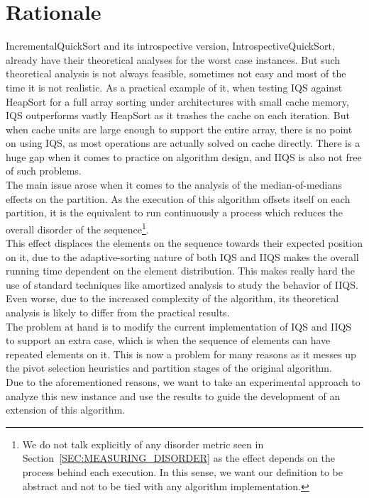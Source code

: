 
\section{Rationale}
IncrementalQuickSort and its introspective version, IntrospectiveQuickSort, already have their theoretical analyses for the worst case instances. But such theoretical analysis is not always feasible, sometimes not easy and most of the time it is not realistic. As a practical example of it, when testing IQS against HeapSort for a full array sorting under architectures with small cache memory, IQS outperforms vastly HeapSort as it trashes the cache on each iteration. But when cache units are large enough to support the entire array, there is no point on using IQS, as most operations are actually solved on cache directly. There is a huge gap when it comes to practice on algorithm design, and IIQS is also not free of such problems.\\

The main issue arose when it comes to the analysis of the median-of-medians effects on the partition. As the execution of this algorithm offsets itself on each partition, it is the equivalent to run continuously a process which reduces the overall disorder of the sequence\footnote{We do not talk explicitly of any disorder metric seen in Section~\ref{SEC:MEASURING_DISORDER} as the effect depends on the process behind each execution. In this sense, we want our definition to be abstract and not to be tied with any algorithm implementation.}.\\

This effect displaces the elements on the sequence towards their expected position on it, due to the adaptive-sorting nature of both IQS and IIQS makes the overall running time dependent on the element distribution. This makes really hard the use of standard techniques like amortized analysis to study the behavior of IIQS. Even worse, due to the increased complexity of the algorithm, its theoretical analysis is likely to differ from the practical results.\\

The problem at hand is to modify the current implementation of IQS and IIQS to support an extra case, which is when the sequence of elements can have repeated elements on it. This is now a problem for many reasons as it messes up the pivot selection heuristics and partition stages of the original algorithm.\\

Due to the aforementioned reasons, we want to take an experimental approach to analyze this new instance and use the results to guide the development of an extension of this algorithm.\\

\FloatBarrier